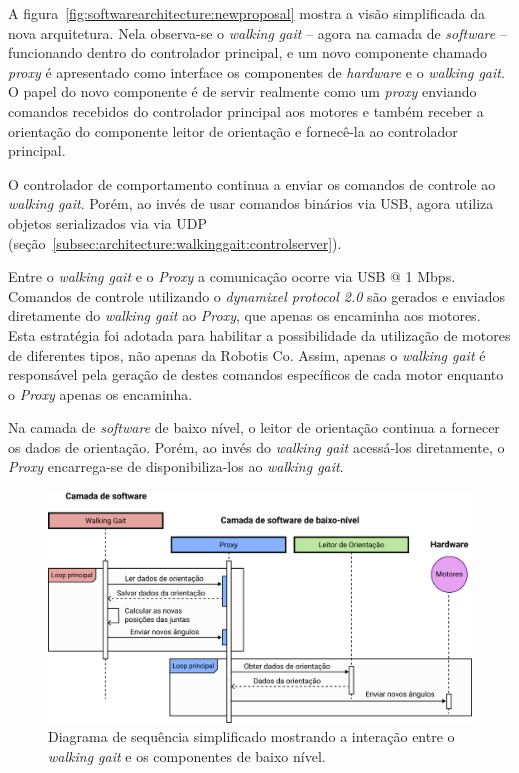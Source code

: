 A figura~\ref{fig:softwarearchitecture:newproposal} mostra a visão simplificada da nova arquitetura. Nela observa-se o \textit{walking gait} -- agora na camada de \textit{software} -- funcionando dentro do controlador principal, e um novo componente chamado \textit{proxy} é apresentado como interface os componentes de \textit{hardware} e o \textit{walking gait}. O papel do novo componente é de servir realmente como um \textit{proxy} enviando comandos recebidos do controlador principal aos motores e também receber a orientação do componente leitor de orientação e fornecê-la ao controlador principal.

O controlador de comportamento continua a enviar os comandos de controle ao \textit{walking gait}. Porém, ao invés de usar comandos binários via USB, agora utiliza objetos serializados via via UDP (seção~\ref{subsec:architecture:walkinggait:controlserver}).

Entre o \textit{walking gait} e o \textit{Proxy} a comunicação ocorre via USB @ 1 Mbps. Comandos de controle utilizando o \textit{dynamixel protocol 2.0} são gerados e enviados diretamente do \textit{walking gait} ao \textit{Proxy}, que apenas os encaminha aos motores. Esta estratégia foi adotada para habilitar a possibilidade da utilização de motores de diferentes tipos, não apenas da Robotis Co. Assim, apenas o \textit{walking gait} é responsável pela geração de destes comandos específicos de cada motor enquanto o \textit{Proxy} apenas os encaminha.

Na camada de \textit{software} de baixo nível, o leitor de orientação continua a fornecer os dados de orientação. Porém, ao invés do \textit{walking gait} acessá-los diretamente, o \textit{Proxy} encarrega-se de disponibiliza-los ao \textit{walking gait}.

\begin{figure}[h!]
	\centering
	\includegraphics[scale=1]{imagens/svg/softwarearchitecture-newproposal-sequence}
	\caption{Diagrama de sequência simplificado mostrando a interação entre o \textit{walking gait} e os componentes de baixo nível.}
	\label{fig:softwarearchitecture:newproposal:sequence}
\end{figure}

